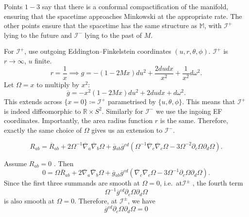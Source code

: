 \begin{remark}
  Points $1-3$ say that there is a conformal compactification of the manifold, ensuring that the spacetime approaches Minkowski at the appropriate rate.
  The other points ensure that the spacetime has the same structure as $\mathbb{M}$, with $\mathscr{I}^+$ lying to the future and $\mathscr{I}^-$ lying to the past of $M$.
\end{remark}
\begin{example}[Schw.]
  For $\mathscr{I}^+$, use outgoing Eddington--Finkelstein coordinates $(u, r, \theta, \phi)$.
  $\mathscr{I}^+$ is $r \to \infty$, $u$ finite.
  \begin{equation}
    r = \frac{1}{x} \implies g = - (1 - 2 M x) du^2 + \frac{2 du dx}{x^2} + \frac{1}{x^2} d\omega^2.
  \end{equation}
  Let $\Omega = x$ to multiply by $x^2$:
  \begin{equation}
    \label{eq:12-star}
    \overline{g}{} = - x^2 (1 - 2 M x) du^2 + 2 du dx + d \omega^2.
  \end{equation}
  This extends across $\{x = 0\} \coloneqq \mathscr{I}^+$ parametrised by $\{u, \theta, \phi\}$.
  This means that $\mathscr{I}^+$ is indeed diffeomorphic to $\mathbb{R} \times S^2$.
  Similarly for $\mathscr{I}^-$ we use the ingoing EF coordinates.
  Importantly, the area radius function $r$ is the same. Therefore, exactly the same choice of $\Omega$ gives us an extension to $\mathscr{I}^-$.
\end{example}

\begin{exercise}[Sheet 2]
  \begin{equation}
    R_{ab} = \overline{R}{}_{ab} + 2 \Omega^{-1} \overline{\nabla}{}_a \overline{\nabla}{}_b \Omega + \overline{g}{}_{ab} \overline{g}{}^{cd} \left( \Omega^{-1} \overline{\nabla}{}_c \overline{\nabla}{}_c \Omega - 3 \Omega^{-2} \partial_c \Omega \partial_d \Omega \right).
  \end{equation}
\end{exercise}
Assume $R_{ab} = 0$ . Then
\begin{equation}
  0 = \Omega\overline{R}{}_{ab} + 2 \overline{\nabla}{}_a \overline{\nabla}{}_b \Omega + \overline{g}{}_{ab} \overline{g}{}^{cd} \left( \overline{\nabla}{}_c \overline{\nabla}{}_c \Omega - 3 \Omega^{-1} \partial_c \Omega \partial_d \Omega \right).
\end{equation}
Since the first three summands are smooth at $\Omega = 0$, i.e.~at$\mathscr{I}^{\pm}$ , the fourth term
\begin{equation}
  \Omega^{-1} \overline{g}{}^{cd} \partial_c \Omega \partial_d \Omega
\end{equation}
is also smooth at $\Omega = 0$.
Therefore, at $\mathscr{I}^{\pm}$, we have
 \begin{equation}
  \overline{g}{}^{cd} \partial_c \Omega \partial_d \Omega = 0
\end{equation}

